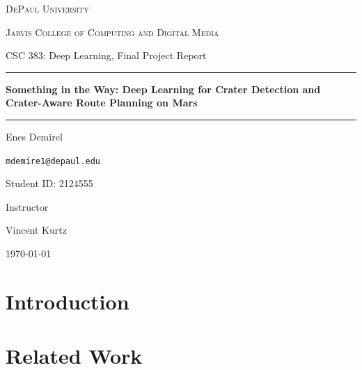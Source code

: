 \documentclass{article}
\date{\today}
\begin{document}
\begin{titlepage}
  \centering
  \vspace*{1cm}

  {\scshape\LARGE DePaul University \par}
  \vspace{0.5cm}
  {\scshape\Large Jarvis College of Computing and Digital Media\par}
  \vspace{2cm}

{\large CSC 383: Deep Learning, Final Project Report\par}  \vspace{0.75cm}
  \rule{\linewidth}{0.5mm}\par
  \vspace{0.4cm}
  {\huge\bfseries Something in the Way: Deep Learning for Crater Detection and Crater-Aware Route Planning on Mars\par}
  \vspace{0.4cm}
  \rule{\linewidth}{0.5mm}\par
  \vspace{2cm}

  {\Large Enes Demirel\par}
  \vspace{0.2cm}
  {\large \texttt{mdemire1@depaul.edu}\par}
  \vspace{0.3cm}
  {\large Student ID: 2124555\par}

  \vfill

{\large Instructor\par}
  \vspace{0.2cm}
  {\large Vincent Kurtz\par}
  \vspace{1.5cm}

  {\large \today\par}
\end{titlepage}

\begin{abstract}
\end{abstract}

\section{Introduction}
\label{sec:introduction}

\section{Related Work}
\label{sec:related_work}
\end{document}
